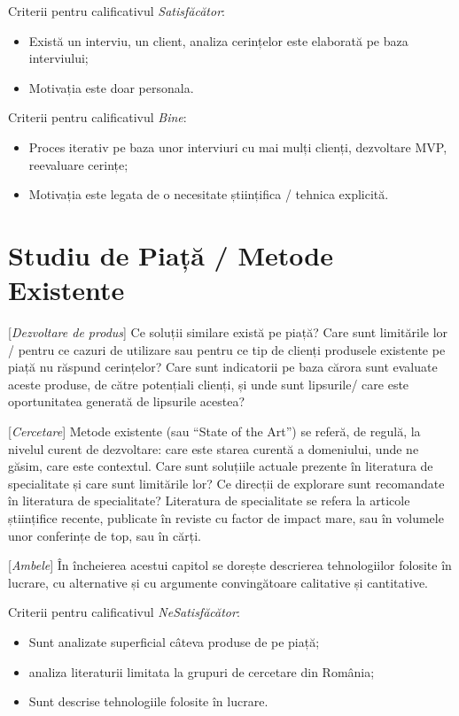 \documentclass[12pt,a4paper]{report}
\newcommand{\worktype}[1]{[\textit{#1}] }
\newcommand{\dezvoltare}{\worktype{Dezvoltare de produs}}
\newcommand{\cercetare}{\worktype{Cercetare}}
\newcommand{\ambele}{\worktype{Ambele}}
\begin{document}
Criterii pentru calificativul \textit{Satisfăcător}:
\begin{itemize}
	\item \dezvoltare Există un interviu, un client, analiza cerințelor este elaborată pe baza interviului;
	\item \cercetare Motivația este doar personala.
\end{itemize}


Criterii pentru calificativul \textit{Bine}:
\begin{itemize}
	\item	 \dezvoltare Proces iterativ pe baza unor interviuri cu mai mulți clienți, dezvoltare MVP, reevaluare cerințe;
	\item	 \cercetare Motivația este legata de o necesitate științifica / tehnica explicită.
\end{itemize}


\chapter{Studiu de Piață / Metode Existente}
\dezvoltare Ce soluții similare există pe piață? Care sunt limitările lor / pentru ce cazuri de utilizare sau pentru ce tip de clienți produsele existente pe piață nu răspund cerințelor? Care sunt indicatorii pe baza cărora sunt evaluate aceste produse, de către potențiali clienți, și unde sunt lipsurile/ care este oportunitatea generată de lipsurile acestea?

\cercetare Metode existente (sau ``State of the Art'') se referă, de regulă, la nivelul curent de dezvoltare: care este starea curentă a domeniului, unde ne găsim, care este contextul. Care sunt soluțiile actuale prezente în literatura de specialitate și care sunt limitările lor? Ce direcții de explorare sunt recomandate în literatura de specialitate? Literatura de specialitate se refera la articole științifice recente, publicate în reviste cu factor de impact mare, sau în volumele unor conferințe de top, sau în cărți.

\ambele În încheierea acestui capitol se dorește descrierea tehnologiilor folosite în lucrare, cu alternative și cu argumente convingătoare calitative și cantitative.

Criterii pentru calificativul \textit{Ne\textit{Satisfăcător}}:
\begin{itemize}
	\item \dezvoltare Sunt analizate superficial câteva produse de pe piață;
	\item \cercetare analiza literaturii limitata la grupuri de cercetare din România;
	\item \ambele Sunt descrise tehnologiile folosite în lucrare.
\end{itemize}
\end{document}
